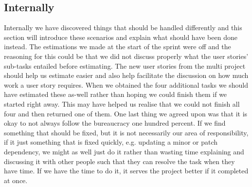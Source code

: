 \subsection{Internally}
Internally we have discovered things that should be handled differently and this section will introduce these scenarios and explain what should have been done instead.
The estimations we made at the start of the sprint were off and the reasoning for this could be that we did not discuss properly what the user stories' sub-tasks entailed before estimating.
The new user stories from the multi project should help us estimate easier and also help facilitate the discussion on how much work a user story requires.
When we obtained the four additional tasks we should have estimated these as-well rather than hoping we could finish them if we started right away.
This may have helped us realise that we could not finish all four and then returned one of them.
One last thing we agreed upon was that it is okay to not always follow the bureaucracy one hundred percent. 
If we find something that should be fixed, but it is not necessarily our area of responsibility, if it just something that is fixed quickly, e.g. updating a minor or patch dependency, we might as well just do it rather than wasting time explaining and discussing it with other people such that they can resolve the task when they have time.
If we have the time to do it, it serves the project better if it completed at once.